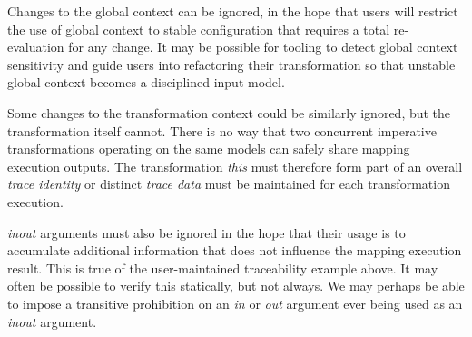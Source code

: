 \documentclass[runningheads,a4paper]{llncs}
\begin{document}
Changes to the global context can be ignored, in the hope that users will restrict the use of global context to stable configuration that requires a total re-evaluation for any change. It may be possible for tooling to detect global context sensitivity and guide users into refactoring their transformation so that unstable global context becomes a disciplined input model.  

Some changes to the transformation context could be similarly ignored, but the transformation itself cannot. There is no way that two concurrent imperative transformations operating on the same models can safely share mapping execution outputs. The transformation \emph{this} must therefore form part of an overall \emph{trace identity} or distinct \emph{trace data} must be maintained for each transformation execution.

\emph{inout} arguments must also be ignored in the hope that their usage is to accumulate additional information that does not influence the mapping execution result. This is true of the user-maintained traceability example above. It may often be possible to verify this statically, but not always. We may perhaps be able to impose a transitive prohibition on an \emph{in} or \emph{out} argument ever being used as an \emph{inout} argument.





\end{document}
